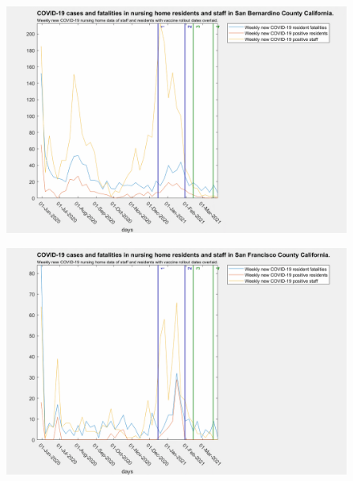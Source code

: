 \documentclass[twoside]{article}
\begin{document}
\begin{multicols}{2}
\begin{figure}[H]
	\includegraphics[width=\linewidth]{images/sanbernardino_nursing_home_with_vaccine.png}
	\caption{}
	\label{fig:images/sanbernardino_nursing_home_with_vaccineLabel}
\end{figure}

\begin{figure}[H]
	\includegraphics[width=\linewidth]{images/sanfrancisco_nursing_home_with_vaccine.png}
	\caption{}
	\label{fig:images/sanfrancisco_nursing_home_with_vaccineLabel}
\end{figure}


\end{multicols}
\end{document}
